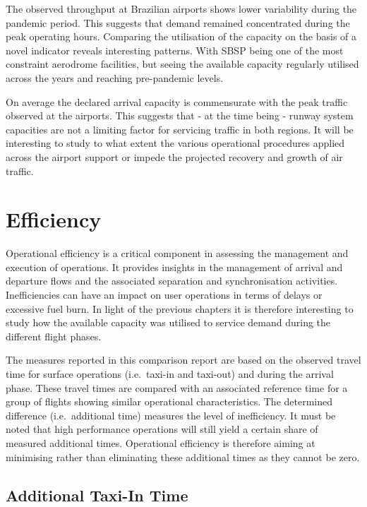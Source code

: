 \documentclass[
  a4paper,
  DIV=11,
  numbers=noendperiod]{scrreport}
\begin{document}
The observed throughput at Brazilian airports shows lower variability
during the pandemic period. This suggests that demand remained
concentrated during the peak operating hours. Comparing the utilisation
of the capacity on the basis of a novel indicator reveals interesting
patterns. With SBSP being one of the most constraint aerodrome
facilities, but seeing the available capacity regularly utilised across
the years and reaching pre-pandemic levels.

On average the declared arrival capacity is commensurate with the peak
traffic observed at the airports. This suggests that - at the time being
- runway system capacities are not a limiting factor for servicing
traffic in both regions. It will be interesting to study to what extent
the various operational procedures applied across the airport support or
impede the projected recovery and growth of air traffic.


\hypertarget{efficiency}{%
\chapter{Efficiency}\label{efficiency}}

Operational efficiency is a critical component in assessing the
management and execution of operations. It provides insights in the
management of arrival and departure flows and the associated separation
and synchronisation activities. Inefficiencies can have an impact on
user operations in terms of delays or excessive fuel burn. In light of
the previous chapters it is therefore interesting to study how the
available capacity was utilised to service demand during the different
flight phases.

The measures reported in this comparison report are based on the
observed travel time for surface operations (i.e.~taxi-in and taxi-out)
and during the arrival phase. These travel times are compared with an
associated reference time for a group of flights showing similar
operational characteristics. The determined difference (i.e.~additional
time) measures the level of inefficiency. It must be noted that high
performance operations will still yield a certain share of measured
additional times. Operational efficiency is therefore aiming at
minimising rather than eliminating these additional times as they cannot
be zero.

\hypertarget{additional-taxi-in-time}{%
\section{Additional Taxi-In Time}\label{additional-taxi-in-time}}
\end{document}
